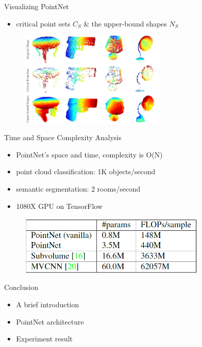 \documentclass[serif,mathserif]{beamer}
\begin{document}
\begin{frame}{Visualizing PointNet}
	\begin{itemize}
		\item critical point sets $ C_S $ \& the upper-bound shapes $ N_S $
	\end{itemize}
	
	\begin{figure}
		\includegraphics[width=7cm]{image/visual.png}
	\end{figure}
\end{frame}

\begin{frame}{Time and Space Complexity Analysis}
	\begin{itemize}
		\item PointNet’s space and time, complexity is O(N)
		\item point cloud classification: 1K objects/second
		\item semantic segmentation: 2 rooms/second
		\item 1080X GPU on TensorFlow
	\end{itemize}
	\begin{figure}
		\includegraphics[width=9cm]{image/time.png}
	\end{figure}
\end{frame}

\begin{frame}{Conclusion}
	\begin{itemize}
		\item A brief introduction
		\item PointNet architecture
		\item Experiment result
	\end{itemize}
\end{frame}
\end{document}
